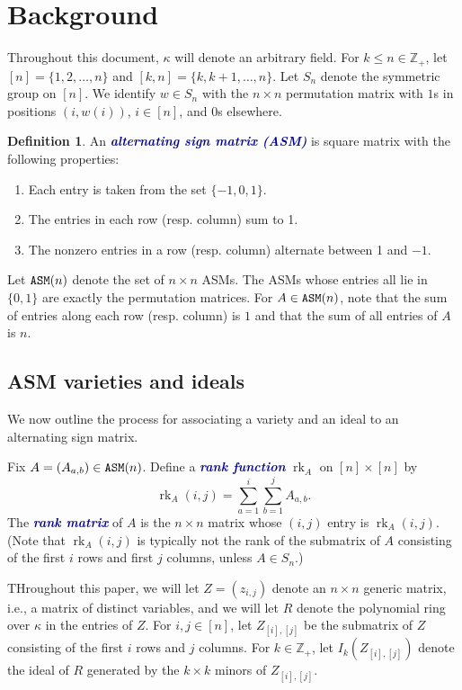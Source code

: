 \documentclass[12 pt]{amsart}
\DeclareMathOperator{\rk}{rk}
\DeclareMathOperator{\asm}{\tt ASM}
\theoremstyle{plain}
\theoremstyle{definition}
\newtheorem{definition}[thm]{Definition}
\theoremstyle{remark}
\newcommand{\newword}[1]{\textcolor{darkblue}{\textbf{\emph{#1}}}}
\begin{document}
\section{Background}\label{sec:background}

Throughout this document, $\kappa$ will denote an arbitrary field.  For $k \leq n \in \mathbb{Z}_+$, let $[n] = \{1, 2, \ldots, n\}$ and $[k,n] = \{k, k+1, \ldots, n\}$. Let $S_n$ denote the symmetric group on $[n]$.  We identify $w \in S_n$ with the $n \times n$ permutation matrix with $1$s in positions $(i,w(i))$, $i \in [n]$, and $0$s elsewhere.

\begin{definition}\label{def: ASM}
An \newword{alternating sign matrix (ASM)} is square matrix with the following properties:
\begin{enumerate}
    \item Each entry is taken from the set $\{-1,0,1\}$.
    \item The entries in each row (resp. column) sum to 1.
    \item The nonzero entries in a row (resp. column) alternate between 1 and $-1$. 
\end{enumerate}
\end{definition}

Let $\asm(n)$ denote the set of $n \times n$ ASMs.  The ASMs whose entries all lie in $\{0,1\}$ are exactly the permutation matrices.  For $A \in \asm(n)$, note that the sum of entries along each row (resp. column) is $1$ and that the sum of all entries of $A$ is $n$.

\subsection{ASM varieties and ideals}
We now outline the process for associating a variety and an ideal to an alternating sign matrix.

Fix $A = (A_{a,b}) \in \asm(n)$.  Define a \newword{rank function} $\rk_A$ on $[n] \times [n]$ by
\[
\rk_A(i,j)=\sum_{a=1}^i\sum_{b=1}^j A_{a,b}.
\]
The \newword{rank matrix} of $A$ is the $n \times n$ matrix whose $(i,j)$ entry is $\rk_A(i,j)$. (Note that $\rk_A(i,j)$ is typically not the rank of the submatrix of $A$ consisting of the first $i$ rows and first $j$ columns, unless $A \in S_n$.)

THroughout this paper, we will let $Z = (z_{i,j})$ denote an $n \times n$ generic matrix, i.e., a matrix of distinct variables, and we will let $R$ denote the polynomial ring over $\kappa$ in the entries of $Z$.  For $i,j \in [n]$, let $Z_{[i],[j]}$ be the submatrix of $Z$ consisting of the first $i$ rows and $j$ columns.  For $k \in \mathbb{Z}_+$, let $I_k(Z_{[i],[j]})$ denote the ideal of $R$ generated by the $k \times k$ minors of $Z_{[i],[j]}$.
\end{document}
